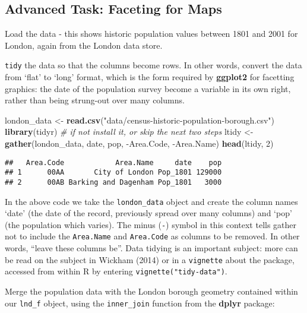\documentclass[]{article}
\newenvironment{Shaded}{}{}
\newcommand{\KeywordTok}[1]{\textcolor[rgb]{0.00,0.44,0.13}{\textbf{{#1}}}}
\newcommand{\DecValTok}[1]{\textcolor[rgb]{0.25,0.63,0.44}{{#1}}}
\newcommand{\StringTok}[1]{\textcolor[rgb]{0.25,0.44,0.63}{{#1}}}
\newcommand{\CommentTok}[1]{\textcolor[rgb]{0.38,0.63,0.69}{\textit{{#1}}}}
\newcommand{\NormalTok}[1]{{#1}}
\begin{document}
\subsection{Advanced Task: Faceting for
Maps}\label{advanced-task-faceting-for-maps}

Load the data - this shows historic population values between 1801 and
2001 for London, again from the London data store.

\texttt{tidy} the data so that the columns become rows. In other words,
convert the data from `flat' to `long' format, which is the form
required by \textbf{ggplot2} for facetting graphics: the date of the
population survey become a variable in its own right, rather than being
strung-out over many columns.

\begin{Shaded}
\begin{Highlighting}[]
\NormalTok{london_data <-}\StringTok{ }\KeywordTok{read.csv}\NormalTok{(}\StringTok{"data/census-historic-population-borough.csv"}\NormalTok{)}
\KeywordTok{library}\NormalTok{(tidyr) }\CommentTok{# if not install it, or skip the next two steps}
\NormalTok{ltidy <-}\StringTok{ }\KeywordTok{gather}\NormalTok{(london_data, date, pop, -Area.Code, -Area.Name)}
\KeywordTok{head}\NormalTok{(ltidy, }\DecValTok{2}\NormalTok{)}
\end{Highlighting}
\end{Shaded}

\begin{verbatim}
##   Area.Code            Area.Name     date    pop
## 1      00AA       City of London Pop_1801 129000
## 2      00AB Barking and Dagenham Pop_1801   3000
\end{verbatim}

In the above code we take the \texttt{london\_data} object and create
the column names `date' (the date of the record, previously spread over
many columns) and `pop' (the population which varies). The minus
(\texttt{-}) symbol in this context tells gather not to include the
\texttt{Area.Name} and \texttt{Area.Code} as columns to be removed. In
other words, ``leave these columns be''. Data tidying is an important
subject: more can be read on the subject in Wickham (2014) or in a
\texttt{vignette} about the package, accessed from within R by entering
\texttt{vignette("tidy-data")}.

Merge the population data with the London borough geometry contained
within our \texttt{lnd\_f} object, using the \texttt{inner\_join}
function from the \textbf{dplyr} package:
\end{document}
